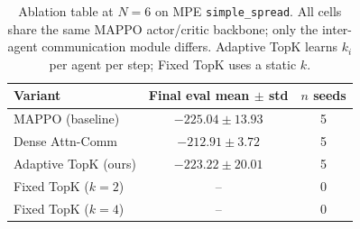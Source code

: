 \begin{table}[t]
\centering
\small
\begin{tabular}{lcc}
\toprule
Variant & Final eval mean $\pm$ std & $n$ seeds \\
\midrule
MAPPO (baseline) & $-225.04 \pm 13.93$ & 5 \\
Dense Attn-Comm & $-212.91 \pm 3.72$ & 5 \\
Adaptive TopK (ours) & $-223.22 \pm 20.01$ & 5 \\
Fixed TopK ($k{=}2$) & -- & 0 \\
Fixed TopK ($k{=}4$) & -- & 0 \\
\bottomrule
\end{tabular}
\caption{Ablation table at $N{=}6$ on MPE
\texttt{simple\_spread}. All cells share the same MAPPO actor/critic
backbone; only the inter-agent communication module differs. Adaptive TopK
learns $k_i$ per agent per step; Fixed TopK uses a static $k$.}
\label{tab:ablation}
\end{table}